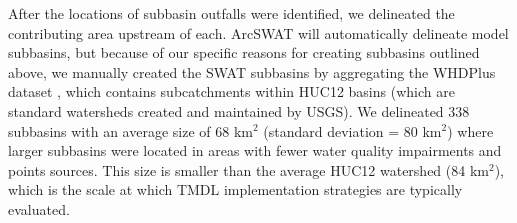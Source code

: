 After the locations of subbasin outfalls were identified, we delineated the contributing area upstream of each.
ArcSWAT will automatically delineate model subbasins, but because of our specific reasons for creating subbasins outlined above, we manually created the SWAT subbasins by aggregating the WHDPlus dataset \citep{wdnr_whdplus_2013}, which contains subcatchments within HUC12 basins (which are standard watersheds created and maintained by USGS). 
We delineated 338 subbasins with an average size of 68 km$^2$ (standard deviation = 80 km$^2$) where larger subbasins were located in areas with fewer water quality impairments and points sources. This size is smaller than the average HUC12 watershed (84 km$^2$), which is the scale at which TMDL implementation strategies are typically evaluated.




